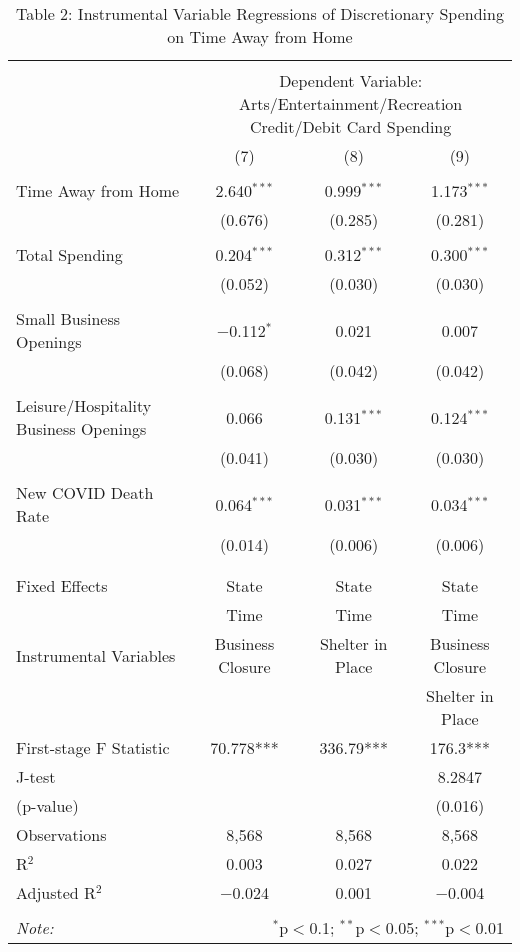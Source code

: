 
\begin{table}[!htbp] \centering 
  \caption{Table 2: Instrumental Variable Regressions of Discretionary Spending on Time Away from Home} 
  \label{} 
\begin{tabular}{@{\extracolsep{5pt}}lccc} 
\\[-1.8ex]\hline 
\hline \\[-1.8ex] 
 & \multicolumn{3}{c}{Dependent Variable: Arts/Entertainment/Recreation Credit/Debit Card Spending} \\ 
\cline{2-4} 
 & (7) & (8) & (9) \\ 
\hline \\[-1.8ex] 
 Time Away from Home & 2.640$^{***}$ & 0.999$^{***}$ & 1.173$^{***}$ \\ 
  & (0.676) & (0.285) & (0.281) \\ 
  & & & \\ 
 Total Spending & 0.204$^{***}$ & 0.312$^{***}$ & 0.300$^{***}$ \\ 
  & (0.052) & (0.030) & (0.030) \\ 
  & & & \\ 
 Small Business Openings & $-$0.112$^{*}$ & 0.021 & 0.007 \\ 
  & (0.068) & (0.042) & (0.042) \\ 
  & & & \\ 
 Leisure/Hospitality Business Openings & 0.066 & 0.131$^{***}$ & 0.124$^{***}$ \\ 
  & (0.041) & (0.030) & (0.030) \\ 
  & & & \\ 
 New COVID Death Rate & 0.064$^{***}$ & 0.031$^{***}$ & 0.034$^{***}$ \\ 
  & (0.014) & (0.006) & (0.006) \\ 
  & & & \\ 
\hline \\[-1.8ex] 
Fixed Effects & State & State & State \\ 
 & Time & Time & Time \\ 
Instrumental Variables & Business Closure & Shelter in Place & Business Closure \\ 
 &  &  & Shelter in Place \\ 
First-stage F Statistic & 70.778*** & 336.79*** & 176.3*** \\ 
J-test &  &  & 8.2847 \\ 
(p-value) &  &  & (0.016) \\ 
Observations & 8,568 & 8,568 & 8,568 \\ 
R$^{2}$ & 0.003 & 0.027 & 0.022 \\ 
Adjusted R$^{2}$ & $-$0.024 & 0.001 & $-$0.004 \\ 
\hline 
\hline \\[-1.8ex] 
\textit{Note:}  & \multicolumn{3}{r}{$^{*}$p$<$0.1; $^{**}$p$<$0.05; $^{***}$p$<$0.01} \\ 
\end{tabular} 
\end{table} 
